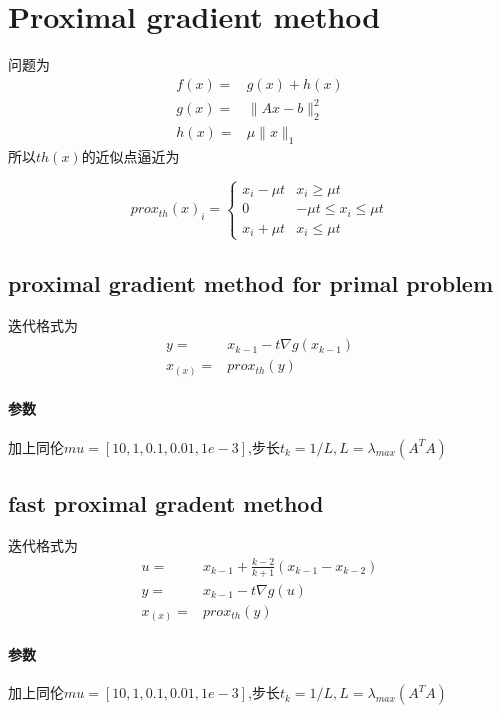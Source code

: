 \documentclass[UTF8]{ctexart}
\begin{document}
  \section{Proximal gradient method}
  问题为
        \begin{equation}
    \begin{split}
    f(x)=  &g(x)+h(x) \\
    g(x)=&  \| Ax-b\|_{2}^{2} \\
    h(x)= & \mu \|x\|_{1}   
    \end{split}
  \end{equation}
  所以$th(x)$的近似点逼近为

 $$
  prox_{th}(x)_{i} = \left\{
  \begin{array}{rcl}
    x_{i}-\mu t & x_{i} \geq \mu t \\
    0 &      -\mu t \leq x_{i} \leq \mu t\\
    x_{i}+\mu t & x_{i} \leq \mu t 
  \end{array}
\right.
$$
  \subsection{proximal gradient method for primal problem}
迭代格式为
        \begin{equation}
    \begin{split}
    y =  & x_{k-1} - t\nabla g(x_{k-1}) \\
    x_(x)=&  prox_{th}(y)
    \end{split}
  \end{equation}
  \paragraph{参数}
  加上同伦$mu = [10,1,0.1,0.01,1e-3]$,步长$t_{k}=1/L,L=\lambda_{max}(A^{T}A) $
  \subsection{fast proximal gradent method}
  迭代格式为
        \begin{equation}
    \begin{split}
    u = &x_{k-1} + \frac{k-2}{k+1}(x_{k-1}-x_{k-2}) \\
    y =  & x_{k-1} - t\nabla g(u) \\
    x_(x)= &  prox_{th}(y) 
    \end{split}
  \end{equation}
  \paragraph{参数}
  加上同伦$mu = [10,1,0.1,0.01,1e-3]$,步长$t_{k}=1/L,L=\lambda_{max}(A^{T}A) $
\end{document}

